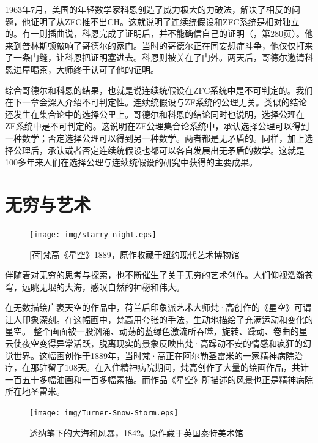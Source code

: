 \documentclass{article}
\begin{document}
1963年7月，美国的年轻数学家科恩创造了威力极大的力破法，解决了相反的问题，他证明了从ZFC推不出CH。这就说明了连续统假设和ZFC系统是相对独立的。有一则插曲说，科恩完成了证明后，并不能确信自己的证明（\cite{HanXueTao16}，第280页）。他来到普林斯顿敲响了哥德尔的家门。当时的哥德尔正在同妄想症斗争，他仅仅打来了一条门缝，让科恩把证明塞进去。科恩则被关在了门外。两天后，哥德尔邀请科恩进屋喝茶，大师终于认可了他的证明。

综合哥德尔和科恩的结果，也就是说连续统假设在ZFC系统中是不可判定的。我们在下一章会深入介绍不可判定性。连续统假设与ZF系统的公理无关。类似的结论还发生在集合论中的选择公里上。哥德尔和科恩的结论同时也说明，选择公理在ZF系统中是不可判定的。这说明在ZF公理集合论系统中，承认选择公理可以得到一种数学；否定选择公理可以得到另一种数学。两者都是无矛盾的。同样，加上选择公理后，承认或者否定连续统假设也都可以各自发展出无矛盾的数学。这就是100多年来人们在选择公理与连续统假设的研究中获得的主要成果\cite{GCH}。

\section{无穷与艺术}

\begin{figure}[htbp]
 \centering
 \texttt{[image: img/starry-night.eps]}
 \captionsetup{labelformat=empty}
 \caption{[荷]梵高《星空》1889，原作收藏于纽约现代艺术博物馆}
 \label{fig:starry-night}
\end{figure}

伴随着对无穷的思考与探索，也不断催生了关于无穷的艺术创作。人们仰视浩瀚苍穹，远眺无垠的大海，感叹自然的神秘和伟大。

在无数描绘广袤天空的作品中，荷兰后印象派艺术大师梵·高创作的《星空》可谓让人印象深刻。在这幅画中，梵高用夸张的手法，生动地描绘了充满运动和变化的星空。 整个画面被一股汹涌、动荡的蓝绿色激流所吞噬，旋转、躁动、卷曲的星云使夜空变得异常活跃，脱离现实的景象反映出梵·高躁动不安的情感和疯狂的幻觉世界。这幅画创作于1889年，当时梵·高正在阿尔勒圣雷米的一家精神病院治疗，在那驻留了108天。在入住精神病院期间，梵高创作了大量的绘画作品，共计一百五十多幅油画和一百多幅素描。而作品《星空》所描述的风景也正是精神病院所在地圣雷米。

\begin{figure}[htbp]
 \centering
 \texttt{[image: img/Turner-Snow-Storm.eps]}
 \captionsetup{labelformat=empty}
 \caption{透纳笔下的大海和风暴，1842。原作藏于英国泰特美术馆}
 \label{fig:Turner-Snow-Storm}
\end{figure}
\end{document}
